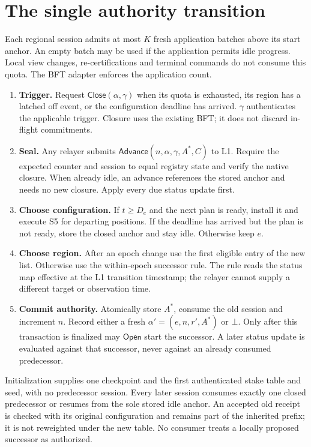 \documentclass[11pt,a4paper]{article}
\newcommand{\Proc}[1]{\mathsf{#1}}
\begin{document}
\section{The single authority transition}
\label{sec:transition}

Each regional session admits at most $K$ fresh application batches above
its start anchor. An empty batch may be used if the application permits
idle progress. Local view changes, re-certifications and terminal commands
do not consume this quota. The BFT adapter enforces the application count.

\begin{enumerate}[label=\textbf{R\arabic*.},itemsep=4pt]
\item \textbf{Trigger.} Request $\Proc{Close}(\alpha,\gamma)$ when its
quota is exhausted, its region has a latched off event, or the configuration
deadline has arrived. $\gamma$ authenticates the applicable trigger.
Closure uses the existing BFT; it does not discard in-flight commitments.
\item \textbf{Seal.} Any relayer submits
$\Proc{Advance}(n,\alpha,\gamma,A^*,C)$ to L1. Require the expected counter
and session to equal registry state and verify the native closure.
When already idle, an advance references the stored anchor and needs no
new closure. Apply every due status update first.
\item \textbf{Choose configuration.} If $t\ge D_e$ and the next plan is
ready, install it and execute S5 for departing positions. If the deadline
has arrived but the plan is not ready, store the closed anchor and stay
idle. Otherwise keep $e$.
\item \textbf{Choose region.} After an epoch change use the first eligible
entry of the new list. Otherwise use the within-epoch successor rule.
The rule reads the status map effective at the L1 transition timestamp;
the relayer cannot supply a different target or observation time.
\item \textbf{Commit authority.} Atomically store $A^*$, consume the old
session and increment $n$. Record either a fresh
$\alpha'=(e,n,r',A^*)$ or $\bot$. Only after this transaction is finalized
may $\Proc{Open}$ start the successor. A later status update is evaluated
against that successor, never against an already consumed predecessor.
\end{enumerate}

Initialization supplies one checkpoint and the first authenticated stake
table and seed, with no predecessor session. Every later session consumes
exactly one closed predecessor or resumes from the sole stored idle anchor.
An accepted old receipt is checked with its original configuration and
remains part of the inherited prefix; it is not reweighted under the new
table. No consumer treats a locally proposed successor as authorized.
\end{document}
